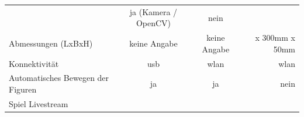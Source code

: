 \begin{longtable}[]{@{}lccr@{}}
\begin{minipage}[t]{0.25\columnwidth}
\end{minipage} & \begin{minipage}[t]{0.26\columnwidth}\centering
ja (Kamera / OpenCV)\strut
\end{minipage} & \begin{minipage}[t]{0.19\columnwidth}\raggedleft
nein\strut
\end{minipage}\tabularnewline
\begin{minipage}[t]{0.19\columnwidth}\raggedright
Abmessungen (LxBxH)\strut
\end{minipage} & \begin{minipage}[t]{0.25\columnwidth}\centering
keine Angabe\strut
\end{minipage} & \begin{minipage}[t]{0.26\columnwidth}\centering
keine Angabe\strut
\end{minipage} & \begin{minipage}[t]{0.19\columnwidth}\raggedleft
450mm x 300mm x 50mm\strut
\end{minipage}\tabularnewline
\begin{minipage}[t]{0.19\columnwidth}\raggedright
Konnektivität\strut
\end{minipage} & \begin{minipage}[t]{0.25\columnwidth}\centering
\gls{usb}\strut
\end{minipage} & \begin{minipage}[t]{0.26\columnwidth}\centering
\gls{wlan}\strut
\end{minipage} & \begin{minipage}[t]{0.19\columnwidth}\raggedleft
\gls{wlan}\strut
\end{minipage}\tabularnewline
\begin{minipage}[t]{0.19\columnwidth}\raggedright
Automatisches Bewegen der Figuren\strut
\end{minipage} & \begin{minipage}[t]{0.25\columnwidth}\centering
ja\strut
\end{minipage} & \begin{minipage}[t]{0.26\columnwidth}\centering
ja\strut
\end{minipage} & \begin{minipage}[t]{0.19\columnwidth}\raggedleft
nein\strut
\end{minipage}\tabularnewline
\begin{minipage}[t]{0.19\columnwidth}\raggedright
Spiel Livestream\strut
\end{minipage} & \begin{minipage}[t]{0.25\columnwidth}\centering

\end{minipage}
\end{longtable}

